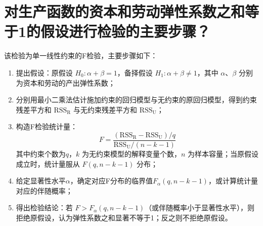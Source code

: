 \documentclass{ctexart}
\begin{document}
\section{对生产函数的资本和劳动弹性系数之和等于1的假设进行检验的主要步骤？}
该检验为单一线性约束的F检验，主要步骤如下：
\begin{enumerate}
\item 提出假设：原假设 $H_0: \alpha+\beta=1$，备择假设 $H_1: \alpha+\beta\neq1$，其中 $\alpha、\beta$ 分别为资本和劳动的产出弹性系数；
\item 分别用最小二乘法估计施加约束的回归模型与无约束的原回归模型，得到约束残差平方和 $\text{RSS}_\text{R}$ 与无约束残差平方和 $\text{RSS}_\text{U}$；
\item 构造F检验统计量：
$$
F = \frac{(\text{RSS}_\text{R}-\text{RSS}_\text{U})/q}{\text{RSS}_\text{U}/(n-k-1)}
$$
其中约束个数为$q$，$k$ 为无约束模型的解释变量个数，$n$ 为样本容量；当原假设成立时，统计量服从 $F(q,n-k-1)$ 分布；
\item 给定显著性水平$\alpha$，确定对应F分布的临界值$F_{\alpha}(q,n-k-1)$，或计算统计量对应的伴随概率；
\item 得出检验结论：若 $F > F_\alpha(q,n-k-1)$（或伴随概率小于显著性水平），则拒绝原假设，认为弹性系数之和显著不等于1；反之则不拒绝原假设。
\end{enumerate}
\end{document}

